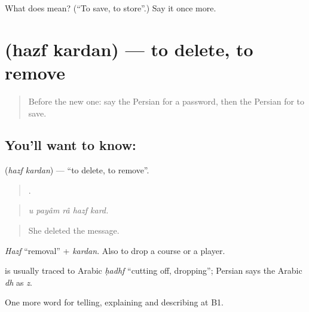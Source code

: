 \begin{tcolorbox}[breakable,colback=teal!4,colframe=teal!35!black,title={Before you move on}]
What does   mean? (\textquotedblleft{}To save, to store\textquotedblright{}.) Say it once more.
\end{tcolorbox}
\section[\texorpdfstring{\fa{حذف} \fa{کردن} (hazf kardan)}{حذف کردن (hazf kardan)}]{  (hazf kardan) — to delete, to remove}

\label{lesson:FA-C416-hazf-kardan}



\begin{quote}
Before the new one: say the Persian for a password, then the Persian for to save.
\end{quote}

\subsection*{You'll want to know:  }
\textbf{ } (\emph{hazf kardan}) — \textquotedblleft{}to delete, to remove\textquotedblright{}.

\begin{quote}
    .
\end{quote}

\begin{quote}
\emph{u payâm râ hazf kard.}
\end{quote}

\begin{quote}
She deleted the message.
\end{quote}

\emph{Hazf} \textquotedblleft{}removal\textquotedblright{} + \emph{kardan}. Also to drop a course or a player.

\begin{cousinweb}
\textbf{} is usually traced to Arabic \emph{ḥadhf} \textquotedblleft{}cutting off, dropping\textquotedblright{}; Persian says the Arabic \emph{dh} as \emph{z}.
\end{cousinweb}

\begin{grammarlens}[title={What you've built}]
One more word for telling, explaining and describing at B1.
\end{grammarlens}

